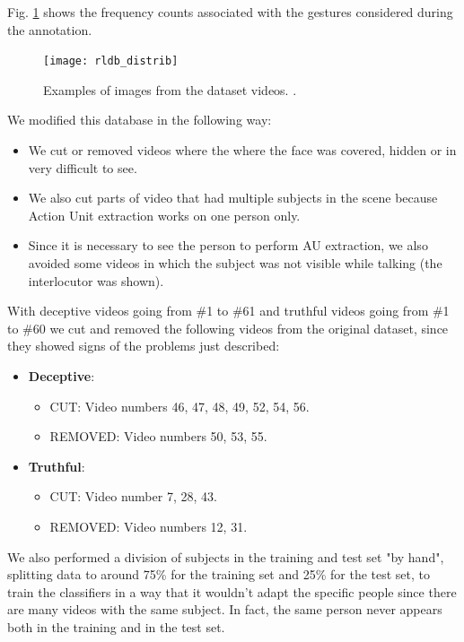 Fig. \ref{fig:rldb_distrib} shows the frequency counts associated with the gestures considered during the annotation.

\begin{figure}[H]
	\centering
	\texttt{[image: rldb\_distrib]}
	\caption{Examples of images from the dataset videos. \cite{Perez-Rosas:2015:DDU:2818346.2820758}.}
	\label{fig:rldb_distrib}
\end{figure}


We modified this database in the following way:
\begin{itemize}
	\item We cut or removed videos where the where the face was covered, hidden or in very difficult to see.
	\item We also cut parts of video that had multiple subjects in the scene because Action Unit extraction works on one person only.
	\item Since it is necessary to see the person to perform AU extraction, we also avoided some videos in which the subject was not visible while talking (the interlocutor was shown).
\end{itemize}

With deceptive videos going from \#1 to \#61 and truthful videos going from \#1 to \#60 we cut and removed the following videos from the original dataset, since they showed signs of the problems just described:

\begin{itemize}
	\item \textbf{Deceptive}:
	\begin{itemize}
		\item CUT: Video numbers 46, 47, 48, 49, 52, 54, 56.
		\item REMOVED: Video numbers 50, 53,  55.
	\end{itemize}
	\item \textbf{Truthful}:
	\begin{itemize}
		\item CUT: Video number 7, 28, 43.
		\item REMOVED: Video numbers 12, 31. 
	\end{itemize}
\end{itemize}


We also performed a division of subjects in the training and test set "by hand", splitting data to around 75\% for the training set and 25\% for the test set, to train the classifiers in a way that it wouldn't adapt the specific people since there are many videos with the same subject. In fact, the same person never appears both in the training and in the test set.

